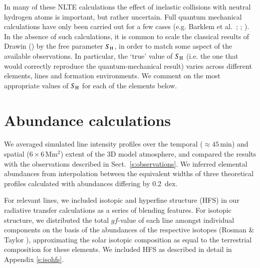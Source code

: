 \documentclass[traditabstract]{aa}
\begin{document}
In many of these NLTE calculations the effect of inelastic collisions with neutral hydrogen atoms is important, but rather uncertain. Full quantum mechanical calculations have only been carried out for a few cases (e.g. Barklem et al.\ \cite{barklem03}; \cite{barklem_na}; \cite{barklem_mg}).  In the absence of such calculations, it is common to scale the classical results of Drawin (\cite{dra}) by the free parameter $S_{\rm H}$, in order to match some aspect of the available observations.  In particular, the `true' value of $S_{\rm H}$ (i.e. the one that would correctly reproduce the quantum-mechanical result) varies across different elements, lines and formation environments.  We comment on the most appropriate values of $S_{\rm H}$ for each of the elements below. 

\section{Abundance calculations}
\label{s:abundancecalculation}

We averaged simulated line intensity profiles over the temporal ($\approx 45$\,min) and spatial ($6\times6$\,Mm$^2$) extent of the 3D model atmosphere, and compared the results with the observations described in Sect.\ \ref{s:observations}.  We inferred elemental abundances from interpolation between the equivalent widths of three theoretical profiles calculated with abundances differing by \mbox{0.2 dex}.

For relevant lines, we included isotopic and hyperfine structure (HFS) in our radiative transfer calculations as a series of blending features.  For isotopic structure, we distributed the total $gf$-value of each line amongst individual components on the basis of the abundances of the respective isotopes (Rosman \& Taylor \cite{IUPAC98}), approximating the solar isotopic composition as equal to the terrestrial composition for these elements. We included HFS as described in detail in Appendix \ref{s:isohfs}.
\end{document}
